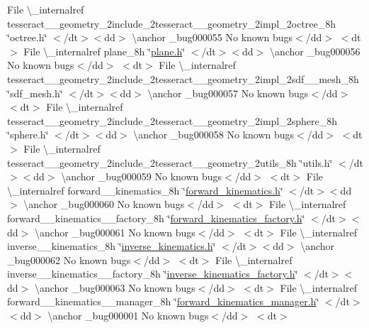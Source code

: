 \begin{DoxyRefList}
\+File \textbackslash{}\+\_\+internalref tesseract\+\_\+\+\_\+geometry\+\_\+2include\+\_\+2tesseract\+\_\+\+\_\+geometry\+\_\+2impl\+\_\+2octree\+\_\+8h \char`\"{}octree.\+h\char`\"{} $<$/dt$>$$<$dd$>$ \textbackslash{}anchor \+\_\+bug000055 No known bugs$<$/dd$>$ $<$dt$>$
\+File \textbackslash{}\+\_\+internalref plane\+\_\+8h \char`\"{}\mbox{\hyperlink{plane_8h}{plane.\+h}}\char`\"{} $<$/dt$>$$<$dd$>$ \textbackslash{}anchor \+\_\+bug000056 No known bugs$<$/dd$>$ $<$dt$>$
\+File \textbackslash{}\+\_\+internalref tesseract\+\_\+\+\_\+geometry\+\_\+2include\+\_\+2tesseract\+\_\+\+\_\+geometry\+\_\+2impl\+\_\+2sdf\+\_\+\+\_\+mesh\+\_\+8h \char`\"{}sdf\+\_\+mesh.\+h\char`\"{} $<$/dt$>$$<$dd$>$ \textbackslash{}anchor \+\_\+bug000057 No known bugs$<$/dd$>$ $<$dt$>$
\+File \textbackslash{}\+\_\+internalref tesseract\+\_\+\+\_\+geometry\+\_\+2include\+\_\+2tesseract\+\_\+\+\_\+geometry\+\_\+2impl\+\_\+2sphere\+\_\+8h \char`\"{}sphere.\+h\char`\"{} $<$/dt$>$$<$dd$>$ \textbackslash{}anchor \+\_\+bug000058 No known bugs$<$/dd$>$ $<$dt$>$
\+File \textbackslash{}\+\_\+internalref tesseract\+\_\+\+\_\+geometry\+\_\+2include\+\_\+2tesseract\+\_\+\+\_\+geometry\+\_\+2utils\+\_\+8h \char`\"{}utils.\+h\char`\"{} $<$/dt$>$$<$dd$>$ \textbackslash{}anchor \+\_\+bug000059 No known bugs$<$/dd$>$ $<$dt$>$
\+File \textbackslash{}\+\_\+internalref forward\+\_\+\+\_\+kinematics\+\_\+8h \char`\"{}\mbox{\hyperlink{forward__kinematics_8h}{forward\+\_\+kinematics.\+h}}\char`\"{} $<$/dt$>$$<$dd$>$ \textbackslash{}anchor \+\_\+bug000060 No known bugs$<$/dd$>$ $<$dt$>$
\+File \textbackslash{}\+\_\+internalref forward\+\_\+\+\_\+kinematics\+\_\+\+\_\+factory\+\_\+8h \char`\"{}\mbox{\hyperlink{forward__kinematics__factory_8h}{forward\+\_\+kinematics\+\_\+factory.\+h}}\char`\"{} $<$/dt$>$$<$dd$>$ \textbackslash{}anchor \+\_\+bug000061 No known bugs$<$/dd$>$ $<$dt$>$
\+File \textbackslash{}\+\_\+internalref inverse\+\_\+\+\_\+kinematics\+\_\+8h \char`\"{}\mbox{\hyperlink{inverse__kinematics_8h}{inverse\+\_\+kinematics.\+h}}\char`\"{} $<$/dt$>$$<$dd$>$ \textbackslash{}anchor \+\_\+bug000062 No known bugs$<$/dd$>$ $<$dt$>$
\+File \textbackslash{}\+\_\+internalref inverse\+\_\+\+\_\+kinematics\+\_\+\+\_\+factory\+\_\+8h \char`\"{}\mbox{\hyperlink{inverse__kinematics__factory_8h}{inverse\+\_\+kinematics\+\_\+factory.\+h}}\char`\"{} $<$/dt$>$$<$dd$>$ \textbackslash{}anchor \+\_\+bug000063 No known bugs$<$/dd$>$ $<$dt$>$
\+File \textbackslash{}\+\_\+internalref forward\+\_\+\+\_\+kinematics\+\_\+\+\_\+manager\+\_\+8h \char`\"{}\mbox{\hyperlink{forward__kinematics__manager_8h}{forward\+\_\+kinematics\+\_\+manager.\+h}}\char`\"{} $<$/dt$>$$<$dd$>$ \textbackslash{}anchor \+\_\+bug000001 No known bugs$<$/dd$>$ $<$dt$>$

\end{DoxyRefList}

